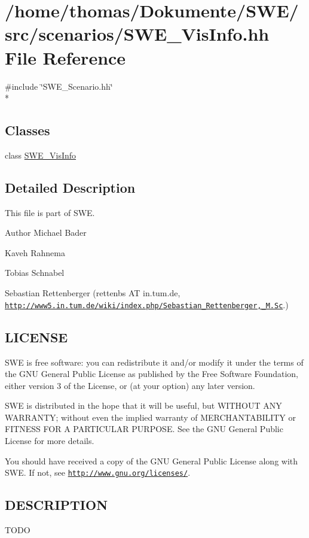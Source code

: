 \hypertarget{SWE__VisInfo_8hh}{\section{/home/thomas/\-Dokumente/\-S\-W\-E/src/scenarios/\-S\-W\-E\-\_\-\-Vis\-Info.hh File Reference}
\label{SWE__VisInfo_8hh}
}
{\ttfamily \#include \char`\"{}S\-W\-E\-\_\-\-Scenario.\-hh\char`\"{}}\\*
\subsection*{Classes}
\begin{DoxyCompactItemize}
\item 
class \hyperlink{classSWE__VisInfo}{S\-W\-E\-\_\-\-Vis\-Info}
\end{DoxyCompactItemize}


\subsection{Detailed Description}
This file is part of S\-W\-E.

\begin{DoxyAuthor}{Author}
Michael Bader 

Kaveh Rahnema 

Tobias Schnabel 

Sebastian Rettenberger (rettenbs A\-T in.\-tum.\-de, \href{http://www5.in.tum.de/wiki/index.php/Sebastian_Rettenberger,_M.Sc}{\tt http\-://www5.\-in.\-tum.\-de/wiki/index.\-php/\-Sebastian\-\_\-\-Rettenberger,\-\_\-\-M.\-Sc}.)
\end{DoxyAuthor}
\hypertarget{Writer_8hh_LICENSE}{}\subsection{L\-I\-C\-E\-N\-S\-E}\label{Writer_8hh_LICENSE}
S\-W\-E is free software\-: you can redistribute it and/or modify it under the terms of the G\-N\-U General Public License as published by the Free Software Foundation, either version 3 of the License, or (at your option) any later version.

S\-W\-E is distributed in the hope that it will be useful, but W\-I\-T\-H\-O\-U\-T A\-N\-Y W\-A\-R\-R\-A\-N\-T\-Y; without even the implied warranty of M\-E\-R\-C\-H\-A\-N\-T\-A\-B\-I\-L\-I\-T\-Y or F\-I\-T\-N\-E\-S\-S F\-O\-R A P\-A\-R\-T\-I\-C\-U\-L\-A\-R P\-U\-R\-P\-O\-S\-E. See the G\-N\-U General Public License for more details.

You should have received a copy of the G\-N\-U General Public License along with S\-W\-E. If not, see \href{http://www.gnu.org/licenses/}{\tt http\-://www.\-gnu.\-org/licenses/}.\hypertarget{NetCdfWriter_8hh_DESCRIPTION}{}\subsection{D\-E\-S\-C\-R\-I\-P\-T\-I\-O\-N}\label{NetCdfWriter_8hh_DESCRIPTION}
T\-O\-D\-O 
